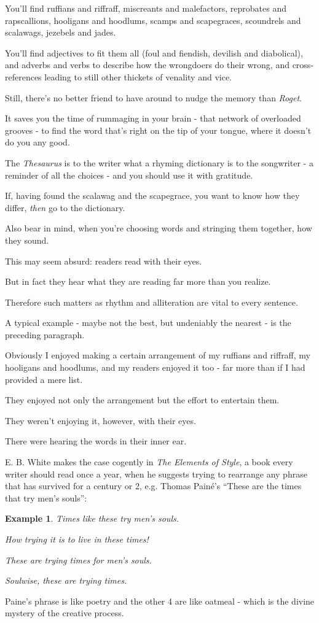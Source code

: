 \documentclass{book}
\numberwithin{equation}{section}
\newtheorem{example}{Example}[chapter]
\begin{document}
You'll find ruffians and riffraff, miscreants and malefactors, reprobates and rapscallions, hooligans and hoodlums, scamps and scapegraces, scoundrels and scalawags, jezebels and jades.

You'll find adjectives to fit them all (foul and fiendish, devilish and diabolical), and adverbs and verbs to describe how the wrongdoers do their wrong, and cross-references leading to still other thickets of venality and vice.

Still, there's no better friend to have around to nudge the memory than \textit{Roget}.

It saves you the time of rummaging in your brain - that network of overloaded grooves - to find the word that's right on the tip of your tongue, where it doesn't do you any good.

The \textit{Thesaurus} is to the writer what a rhyming dictionary is to the songwriter - a reminder of all the choices - and you should use it with gratitude.

If, having found the scalawag and the scapegrace, you want to know how they differ, \textit{then} go to the dictionary.

%
Also bear in mind, when you're choosing words and stringing them together, how they sound.

This may seem absurd: readers read with their eyes.

But in fact they hear what they are reading far more than you realize.

Therefore such matters as rhythm and alliteration are vital to every sentence.

A typical example - maybe not the best, but undeniably the nearest - is the preceding paragraph.

Obviously I enjoyed making a certain arrangement of my ruffians and riffraff, my hooligans and hoodlums, and my readers enjoyed it too - far more than if I had provided a mere list.

They enjoyed not only the arrangement but the effort to entertain them.

They weren't enjoying it, however, with their eyes.

There were hearing the words in their inner ear.

E. B. White makes the case cogently in \textit{The Elements of Style}, a book every writer should read once a year, when he suggests trying to rearrange any phrase that has survived for a century or 2, e.g. Thomas Pain\'e's ``These are the times that try men's souls'':
\begin{example}
    Times like these try men's souls.
    
    How trying it is to live in these times!
    
    These are trying times for men's souls.
    
    Soulwise, these are trying times.
\end{example}
Paine's phrase is like poetry and the other 4 are like oatmeal - which is the divine mystery of the creative process.
\end{document}
